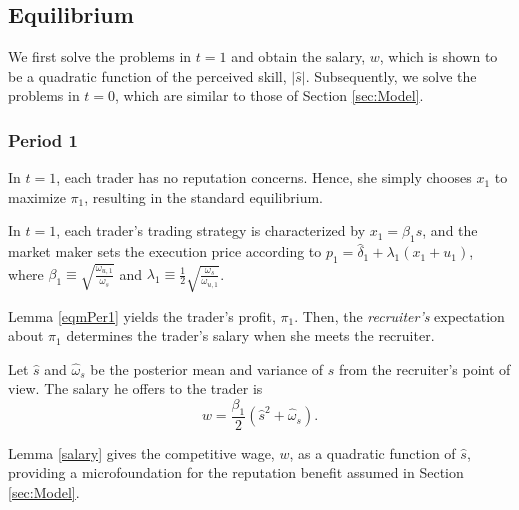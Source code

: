 


\subsection{Equilibrium} \label{ss:eqm_endog}

We first solve the problems in $t=1$ and obtain the salary, $w$, which is shown to be a quadratic function of the perceived skill, $|\hat{s}|$. Subsequently, we solve the problems in $t=0$, which are similar to those of Section \ref{sec:Model}.

\subsubsection{Period 1} \label{sss:period1}
In $t=1$, each trader has no reputation concerns. Hence, she simply chooses $x_{1}$ to maximize $\pi_{1}$, resulting in the standard \citet{kyle1985continuous} equilibrium.
\begin{lemma}[Equilibrium in $t=1$]\label{eqmPer1}
In $t=1$, each trader's trading strategy is characterized by $x_{1} =\beta_{1}s$, and the market maker sets the execution price according to $p_{1}=\hat{\delta}_{1}+\lambda_{1}\left(x_{1}+u_{1}\right)$, where $\beta_{1}\equiv\sqrt{\frac{\omega_{u,1}}{\omega_{s}}}$ and $\lambda_{1}\equiv\frac{1}{2}\sqrt{\frac{\omega_{s}}{\omega_{u,1}}}$.
\end{lemma}
Lemma \ref{eqmPer1} yields the trader's profit, $\pi_{1}$. Then, the \textit{recruiter's} expectation about $\pi_{1}$ determines the trader's salary when she meets the recruiter. 
\begin{lemma}\label{salary}
Let $\hat{s}$ and $\hat{\omega}_{s}$ be the posterior mean and variance of $s$ from the recruiter's point of view. The salary he offers to the trader is
\begin{equation}
w=\frac{\beta_{1}}{2}\left(\hat{s}^{2}+\hat{\omega}_{s}\right).\label{w}
\end{equation}
\end{lemma}
Lemma \ref{salary} gives the competitive wage, $w$, as a quadratic function of $\hat{s}$, providing a microfoundation for the reputation benefit assumed in Section \ref{sec:Model}. 


